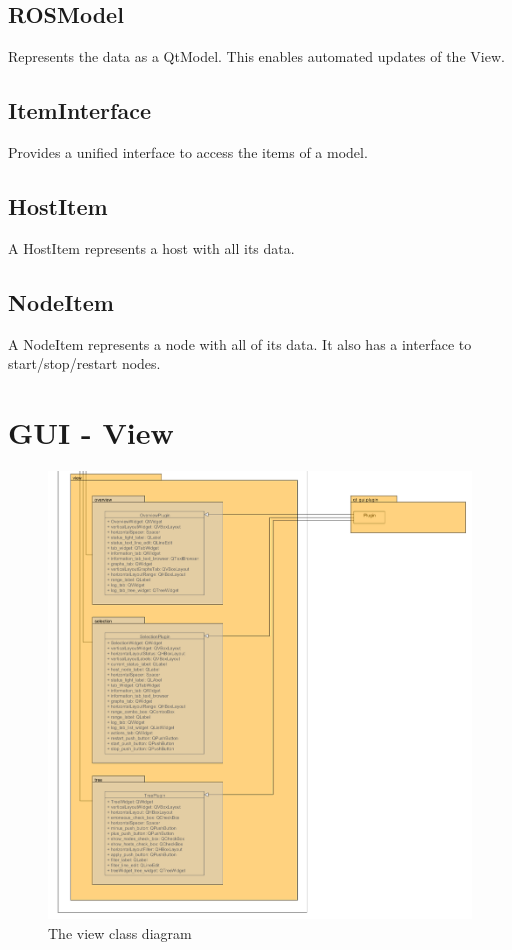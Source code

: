 \subsection{ROSModel}
Represents the data as a QtModel. This enables automated updates of the View.
\subsection{ItemInterface}
Provides a unified interface to access the items of a model.
\subsection{HostItem}
A HostItem represents a host with all its data.
\subsection{NodeItem}
 A NodeItem represents a node with all of its data. It also has a interface to start/stop/restart nodes.


\section{GUI - View}
\begin{figure}[!ht]
\begin{center}
\includegraphics[width=\linewidth]{./bilder/view.png}
\caption{The view class diagram}
\end{center}
\end{figure}

